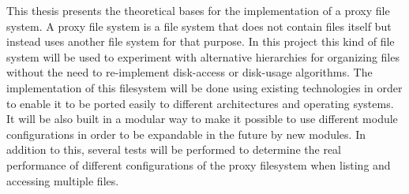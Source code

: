 


\begin{abstracts}        %

This thesis presents the theoretical bases for the implementation of a proxy file system. A proxy file system is a file system that does not contain files itself but instead uses another file system for that purpose. In this project this kind of file system will be used to experiment with alternative hierarchies for organizing files without the need to re-implement disk-access or disk-usage algorithms. The implementation of this filesystem will be done using existing technologies in order to enable it to be ported easily to different architectures and operating systems. It will be also built in a modular way to make it possible to use different module configurations in order to be expandable in the future by new modules. In addition to this, several tests will be performed to determine the real performance of different configurations of the proxy filesystem when listing and accessing multiple files.

\end{abstracts}




